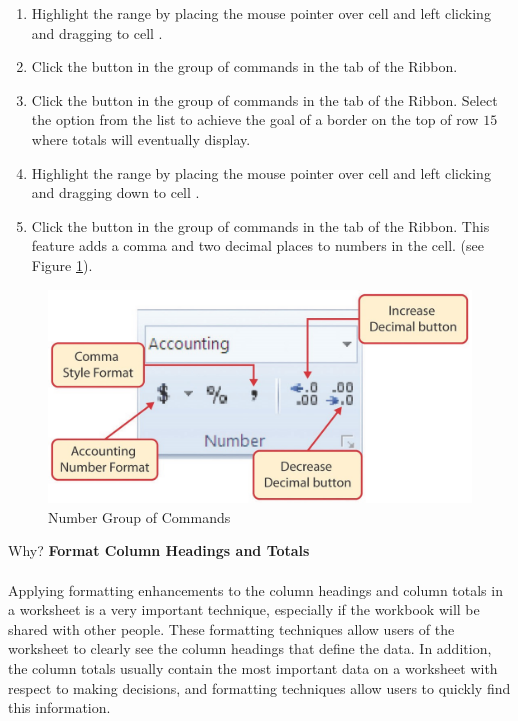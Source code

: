 \begin{enumerate}[resume]
	\item Highlight the range  by placing the mouse pointer over cell  and left clicking and dragging to cell .
	\item Click the  button in the  group of commands in the  tab of the Ribbon.
	\item Click the  button in the  group of commands in the  tab of the Ribbon. Select the  option from the list to achieve the goal of a border on the top of row $ 15 $ where totals will eventually display.
	\item Highlight the range  by placing the mouse pointer over cell  and left clicking and dragging down to cell .
	\item Click the  button in the  group of commands in the  tab of the Ribbon. This feature adds a comma and two decimal places to numbers in the cell. (see Figure \ref{01:fig35}).
\end{enumerate}

\begin{figure}[H]
	\centering
	\includegraphics[width=\maxwidth{.95\linewidth}]{gfx/ch01_fig35}
	\caption{Number Group of Commands}
	\label{01:fig35}
\end{figure}

\begin{center}
	\begin{infobox}{Why?}
		\textbf{Format Column Headings and Totals}
		\\
		\\
		Applying formatting enhancements to the column headings and column totals in a worksheet is a very important technique, especially if the workbook will be shared with other people. These formatting techniques allow users of the worksheet to clearly see the column headings that define the data. In addition, the column totals usually contain the most important data on a worksheet with respect to making decisions, and formatting techniques allow users to quickly find this information.
	\end{infobox}
\end{center}


